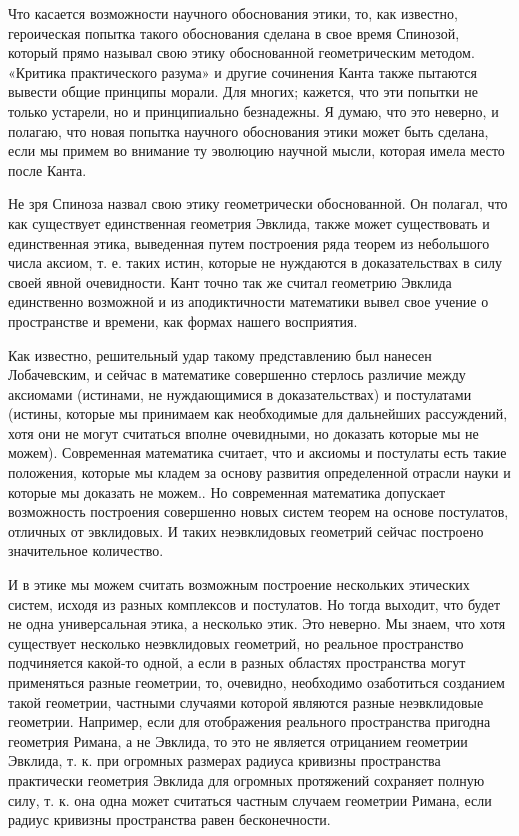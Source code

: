 Что касается возможности научного обоснования этики, то, как известно,
героическая попытка такого обоснования сделана в свое время Спинозой,
который прямо называл свою этику обоснованной геометрическим методом.
«Критика практического разума» и другие сочинения Канта также пытаются
вывести общие принципы морали. Для многих; кажется, что эти попытки не
только устарели, но и принципиально безнадежны. Я думаю, что это
неверно, и полагаю, что новая попытка научного обоснования этики может
быть сделана, если мы примем во внимание ту эволюцию научной мысли,
которая имела место после Канта.

Не зря Спиноза назвал свою этику геометрически обоснованной. Он
полагал, что как существует единственная геометрия Эвклида, также
может существовать и единственная этика, выведенная путем построения
ряда теорем из небольшого числа аксиом, т. е. таких истин, которые не
нуждаются в доказательствах в силу своей явной очевидности. Кант точно
так же считал геометрию Эвклида единственно возможной и из
аподиктичности математики вывел свое учение о пространстве и времени,
как формах нашего восприятия.

Как известно, решительный удар такому представлению был нанесен
Лобачевским, и сейчас в математике совершенно стерлось различие между
аксиомами (истинами, не нуждающимися в доказательствах) и постулатами
(истины, которые мы принимаем как необходимые для дальнейших
рассуждений, хотя они не могут считаться вполне очевидными, но
доказать которые мы не можем). Современная математика считает, что и
аксиомы и постулаты есть такие положения, которые мы кладем за основу
развития определенной отрасли науки и которые мы доказать не можем..
Но современная математика допускает возможность построения совершенно
новых систем теорем на основе постулатов, отличных от эвклидовых. И
таких неэвклидовых геометрий сейчас построено значительное количество.

И в этике мы можем считать возможным построение нескольких этических
систем, исходя из разных комплексов и постулатов. Но тогда выходит,
что будет не одна универсальная этика, а несколько этик. Это неверно.
Мы знаем, что хотя существует несколько неэвклидовых геометрий, но
реальное пространство подчиняется какой-то одной, а если в разных
областях пространства могут применяться разные геометрии, то,
очевидно, необходимо озаботиться созданием такой геометрии, частными
случаями которой являются разные неэвклидовые геометрии. Например,
если для отображения реального пространства пригодна геометрия Римана,
а не Эвклида, то это не является отрицанием геометрии Эвклида, т. к.
при огромных размерах радиуса кривизны пространства практически
геометрия Эвклида для огромных протяжений сохраняет полную силу, т. к.
она одна может считаться частным случаем геометрии Римана, если радиус
кривизны пространства равен бесконечности.

